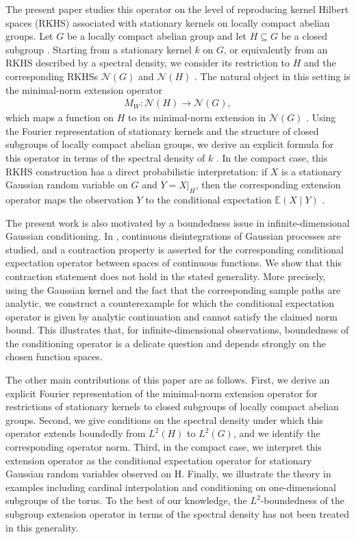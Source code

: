 \documentclass{article}
\begin{document}
The present paper studies this operator on the level of reproducing kernel Hilbert spaces (RKHS) associated with stationary kernels on locally compact abelian groups. Let $G$ be a locally compact abelian group and let $H\subseteq G$ be a closed subgroup \cite{Folland}. Starting from a stationary kernel $k$ on $G$, or equivalently from an RKHS described by a spectral density, we consider its restriction to $H$ and the corresponding RKHSs $\mathcal N(G)$ and $\mathcal N(H)$ \cite{feichtinger2007minimal,wendland2004scattered}. The natural object in this setting is the minimal-norm extension operator
\begin{align*}
    M_W:\mathcal N(H)\to \mathcal N(G),
\end{align*}
which maps a function on $H$ to its minimal-norm extension in $\mathcal N(G)$ \cite[Chapter 10.7]{wendland2004scattered}. Using the Fourier representation of stationary kernels and the structure of closed subgroups of locally compact abelian groups, we derive an explicit formula for this operator in terms of the spectral density of $k$ \cite{feichtinger2007minimal}. In the compact case, this RKHS construction has a direct probabilistic interpretation: if $X$ is a stationary Gaussian random variable on $G$ and $Y=X|_H$, then the corresponding extension operator maps the observation $Y$ to the conditional expectation $\mathbb E(X\mid Y)$ \cite{WinkleAnalysis,steinwart2024conditioning}.

The present work is also motivated by a boundedness issue in infinite-dimensional Gaussian conditioning. In \cite{lagatta2013continuous}, continuous disintegrations of Gaussian processes are studied, and a contraction property is asserted for the corresponding conditional expectation operator between spaces of continuous functions. We show that this contraction statement does not hold in the stated generality. More precisely, using the Gaussian kernel and the fact that the corresponding sample paths are analytic, we construct a counterexample for which the conditional expectation operator is given by analytic continuation and cannot satisfy the claimed norm bound. This illustrates that, for infinite-dimensional observations, boundedness of the conditioning operator is a delicate question and depends strongly on the chosen function spaces. 

The other main contributions of this paper are as follows. First, we derive an explicit Fourier representation of the minimal-norm extension operator for restrictions of stationary kernels to closed subgroups of locally compact abelian groups. Second, we give conditions on the spectral density under which this operator extends boundedly from $L^2(H)$ to $L^2(G)$, and we identify the corresponding operator norm. Third, in the compact case, we interpret this extension operator as the conditional expectation operator for stationary Gaussian random variables observed on H. Finally, we illustrate the theory in examples including cardinal interpolation and conditioning on one-dimensional subgroups of the torus. To the best of our knowledge, the $L^2$-boundedness of the subgroup extension operator in terms of the spectral density has not been treated in this generality.
\end{document}
